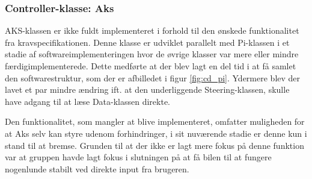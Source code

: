\subsubsection{Controller-klasse: Aks} \label{sec:aks_impl}

AKS-klassen er ikke fuldt implementeret i forhold til den ønskede funktionalitet fra kravspecifikationen.
Denne klasse er udviklet parallelt med Pi-klassen i et stadie af softwareimplementeringen hvor de øvrige klasser var mere eller mindre færdigimplementerede.
Dette medførte at der blev lagt en del tid i at få samlet den softwarestruktur, som der er afbilledet i figur \ref{fig:cd_pi}.
Ydermere blev der lavet et par mindre ændring ift. at den underliggende Steering-klassen, skulle have adgang til at læse Data-klassen direkte.

Den funktionalitet, som mangler at blive implementeret, omfatter muligheden for at Aks selv kan styre udenom forhindringer, i sit nuværende stadie er denne kun i stand til at bremse.
Grunden til at der ikke er lagt mere fokus på denne funktion var at gruppen havde lagt fokus i slutningen på at få bilen til at fungere nogenlunde stabilt ved direkte input fra brugeren.
